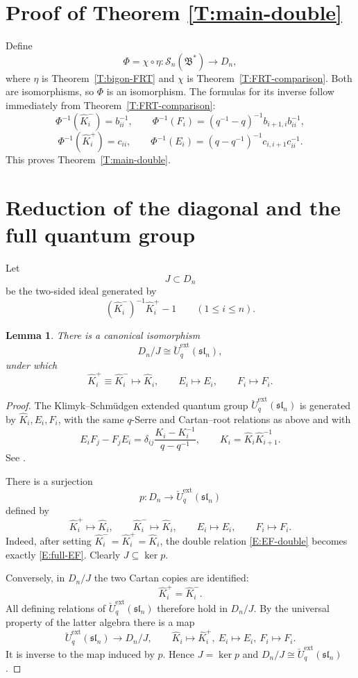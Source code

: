 \documentclass[11pt]{amsart}
\newtheorem{lemma}[theorem]{Lemma}
\theoremstyle{definition}
\theoremstyle{remark}
\begin{document}
\section{Proof of Theorem \ref{T:main-double}}

Define
\[
\Phi=\chi\circ\eta:
\mathcal S_n(\mathfrak B^*)\longrightarrow D_n,
\]
where \(\eta\) is Theorem~\ref{T:bigon-FRT} and \(\chi\) is
Theorem~\ref{T:FRT-comparison}.  Both are isomorphisms, so \(\Phi\) is an
isomorphism.  The formulas for its inverse follow immediately from
Theorem~\ref{T:FRT-comparison}:
\[
\Phi^{-1}(\hat K_i^-)=b_{ii}^{-1},\qquad
\Phi^{-1}(F_i)=(q^{-1}-q)^{-1}b_{i+1,i}b_{ii}^{-1},
\]
\[
\Phi^{-1}(\hat K_i^+)=c_{ii},\qquad
\Phi^{-1}(E_i)=(q-q^{-1})^{-1}c_{i,i+1}c_{ii}^{-1}.
\]
This proves Theorem~\ref{T:main-double}.

\section{Reduction of the diagonal and the full quantum group}

Let
\[
J\subset D_n
\]
be the two-sided ideal generated by
\[
(\hat K_i^-)^{-1}\hat K_i^+-1\qquad(1\leq i\leq n).
\]

\begin{lemma}\label{L:reduced-double}
There is a canonical isomorphism
\[
D_n/J\cong \breve U_q^{\mathrm{ext}}(\mathfrak{sl}_n),
\]
under which
\[
\hat K_i^+\equiv\hat K_i^-\longmapsto\hat K_i,\qquad
E_i\longmapsto E_i,\qquad F_i\longmapsto F_i.
\]
\end{lemma}

\begin{proof}
The Klimyk--Schm\"udgen extended quantum group
\(\breve U_q^{\mathrm{ext}}(\mathfrak{sl}_n)\) is generated by
\(\hat K_i,E_i,F_i\), with the same \(q\)-Serre and Cartan--root relations
as above and with
\begin{equation}\label{E:full-EF}
E_iF_j-F_jE_i
=\delta_{ij}\frac{K_i-K_i^{-1}}{q-q^{-1}},
\qquad
K_i=\hat K_i\hat K_{i+1}^{-1}.
\end{equation}
See \cite[Chapter~6]{KS}.

There is a surjection
\[
p:D_n\longrightarrow \breve U_q^{\mathrm{ext}}(\mathfrak{sl}_n)
\]
defined by
\[
\hat K_i^+\mapsto\hat K_i,\qquad
\hat K_i^-\mapsto\hat K_i,\qquad
E_i\mapsto E_i,\qquad F_i\mapsto F_i.
\]
Indeed, after setting \(\hat K_i^-=\hat K_i^+=\hat K_i\), the double
relation \eqref{E:EF-double} becomes exactly \eqref{E:full-EF}.  Clearly
\(J\subseteq\ker p\).

Conversely, in \(D_n/J\) the two Cartan copies are identified:
\[
\hat K_i^+=\hat K_i^-.
\]
All defining relations of
\(\breve U_q^{\mathrm{ext}}(\mathfrak{sl}_n)\) therefore hold in \(D_n/J\).
By the universal property of the latter algebra there is a map
\[
\breve U_q^{\mathrm{ext}}(\mathfrak{sl}_n)\longrightarrow D_n/J,
\qquad
\hat K_i\mapsto\hat K_i^+,\ E_i\mapsto E_i,\ F_i\mapsto F_i.
\]
It is inverse to the map induced by \(p\).  Hence
\(J=\ker p\) and \(D_n/J\cong
\breve U_q^{\mathrm{ext}}(\mathfrak{sl}_n)\).
\end{proof}
\end{document}
